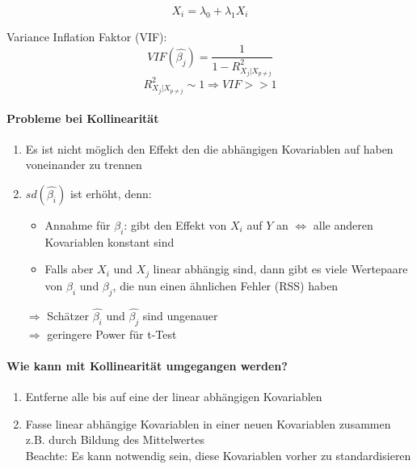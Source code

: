 \documentclass[10pt]{report}
\theoremstyle{definition}
\begin{document}
\[ X_i = \lambda_0 + \lambda_1 X_i \]

Variance Inflation Faktor (VIF):
\[ VIF(\hat{\beta_j})= \frac{1}{1- R_{X_j|X_{p \neq j}}^{2}} \]
\[ R_{X_j|X_{p \neq j}}^{2} \sim 1 \Rightarrow VIF >> 1 \]

\paragraph{Probleme bei Kollinearität}
\begin{enumerate}
	\item Es ist nicht möglich den Effekt den die abhängigen Kovariablen auf  haben voneinander zu trennen
	\item $sd(\hat{\beta_i})$ ist erhöht, denn: 
		\begin{itemize}
			\item Annahme für $\beta_i$: gibt den Effekt von $X_i$ auf $Y$ an $\Leftrightarrow$ alle anderen Kovariablen konstant sind
			\item Falls aber $X_i$ und $X_j$ linear abhängig sind, dann gibt es viele Wertepaare von $\beta_i$ und $\beta_j$, die nun einen ähnlichen Fehler (RSS) haben
		\end{itemize}
		$\Rightarrow$ Schätzer $\hat{\beta_i}$ und $\hat{\beta_j}$ sind ungenauer \\
		$\Rightarrow$ geringere Power für t-Test
\end{enumerate}

\paragraph{Wie kann mit Kollinearität umgegangen werden?}
\begin{enumerate}
	\item Entferne alle bis auf eine der linear abhängigen Kovariablen
	\item Fasse linear abhängige Kovariablen in einer neuen Kovariablen zusammen z.B. durch Bildung des Mittelwertes \\
		Beachte: Es kann notwendig sein, diese Kovariablen vorher zu standardisieren
\end{enumerate}
\end{document}
